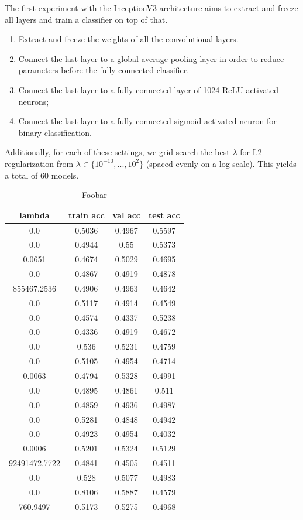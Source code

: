 The first experiment with the InceptionV3 architecture aims to extract and freeze all layers and train a classifier on top of that.

\begin{enumerate}
    \item Extract and freeze the weights of all the convolutional layers.
    \item Connect the last layer to a global average pooling layer in order to reduce parameters before the fully-connected classifier.
    \item Connect the last layer to a fully-connected layer of 1024 ReLU-activated neurons;
    \item Connect the last layer to a fully-connected sigmoid-activated neuron for binary classification.
\end{enumerate}

Additionally, for each of these settings, we grid-search the best $\lambda$ for L2-regularization from $\lambda \in \{10^{-10}, ..., 10^{2}\}$ (spaced evenly on a log scale). This yields a total of $60$ models.

\begin{table}[ht]
\centering \begin{tabular}{ |c|c|c|c| }
\hline
lambda & train acc & val acc & test acc \\
\hline
0.0 & 0.5036 & 0.4967 & 0.5597 \\
0.0 & 0.4944 & 0.55 & 0.5373 \\
0.0651 & 0.4674 & 0.5029 & 0.4695 \\
0.0 & 0.4867 & 0.4919 & 0.4878 \\
855467.2536 & 0.4906 & 0.4963 & 0.4642 \\
0.0 & 0.5117 & 0.4914 & 0.4549 \\
0.0 & 0.4574 & 0.4337 & 0.5238 \\
0.0 & 0.4336 & 0.4919 & 0.4672 \\
0.0 & 0.536 & 0.5231 & 0.4759 \\
0.0 & 0.5105 & 0.4954 & 0.4714 \\
0.0063 & 0.4794 & 0.5328 & 0.4991 \\
0.0 & 0.4895 & 0.4861 & 0.511 \\
0.0 & 0.4859 & 0.4936 & 0.4987 \\
0.0 & 0.5281 & 0.4848 & 0.4942 \\
0.0 & 0.4923 & 0.4954 & 0.4032 \\
0.0006 & 0.5201 & 0.5324 & 0.5129 \\
92491472.7722 & 0.4841 & 0.4505 & 0.4511 \\
0.0 & 0.528 & 0.5077 & 0.4983 \\
0.0 & 0.8106 & 0.5887 & 0.4579 \\
760.9497 & 0.5173 & 0.5275 & 0.4968 \\
\hline
\end{tabular}
\caption{Foobar}
\label{table:foobar}
\end{table}

